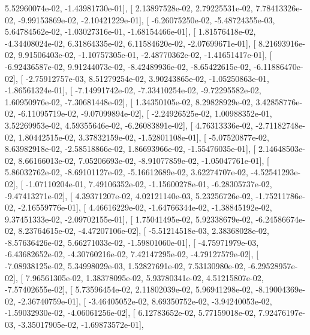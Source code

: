 \documentclass{article}
\begin{document}
          5.52960074e-02,  -1.43981730e-01],
       [  2.13897528e-02,   2.79225531e-02,   7.78413326e-02,
         -9.99153869e-02,  -2.10421229e-01],
       [ -6.26075250e-02,  -5.48724355e-03,   5.64784562e-02,
         -1.03027316e-01,  -1.68154466e-01],
       [  1.81576418e-02,  -4.34408024e-02,   6.31864335e-02,
          6.11584620e-02,  -2.07699671e-01],
       [  8.21693916e-02,   9.91506403e-02,  -1.10757305e-01,
         -2.48770362e-02,  -1.41651417e-01],
       [ -6.92436587e-02,   9.91244073e-02,  -8.42489936e-02,
         -8.65422615e-02,  -6.11886470e-02],
       [ -2.75912757e-03,   8.51279254e-02,   3.90243865e-02,
         -1.05250863e-01,  -1.86561324e-01],
       [ -7.14991742e-02,  -7.33410254e-02,  -9.72295582e-02,
          1.60950976e-02,  -7.30681448e-02],
       [  1.34350105e-02,   8.29828929e-02,   3.42858776e-02,
         -6.11095719e-02,  -9.07099894e-02],
       [ -2.24926525e-02,   1.00988352e-01,   3.52269953e-02,
          4.59355646e-02,  -6.26083891e-02],
       [  4.76313336e-02,  -2.71182748e-02,   1.80442515e-02,
          3.37832159e-02,  -1.52801108e-01],
       [ -5.07520877e-02,   8.63982918e-02,  -2.58518866e-02,
          1.86693966e-02,  -1.55476035e-01],
       [  2.14648503e-02,   8.66166013e-02,   7.05206693e-02,
         -8.91077859e-02,  -1.05047761e-01],
       [  5.86032762e-02,  -8.69101127e-02,  -5.16612689e-02,
          3.62274707e-02,  -4.52541293e-02],
       [ -1.07110204e-01,   7.49106352e-02,  -1.15600278e-01,
         -6.28305737e-02,  -9.47413271e-02],
       [  4.39371207e-02,   4.02121140e-03,   5.23256726e-02,
         -1.75211786e-02,  -2.16559776e-01],
       [  4.46616229e-02,  -1.64766344e-02,  -1.38845192e-02,
          9.37451333e-02,  -2.09702155e-01],
       [  1.75041495e-02,   5.92338679e-02,  -6.24586674e-02,
          8.23764615e-02,  -4.47207106e-02],
       [ -5.51214518e-03,   2.38368028e-02,  -8.57636426e-02,
          5.66271033e-02,  -1.59801060e-01],
       [ -4.75971979e-03,  -6.43682652e-02,  -4.30760216e-02,
          7.42147295e-02,  -4.79127579e-02],
       [ -7.08938125e-02,   5.34998029e-03,   1.52827691e-02,
          7.53130980e-02,  -6.29528957e-02],
       [  7.96561305e-02,   1.38378095e-02,   5.93780341e-02,
          4.51215807e-02,  -7.57402655e-02],
       [  5.73596454e-02,   2.11802039e-02,   5.96941298e-02,
         -8.19004369e-02,  -2.36740759e-01],
       [ -3.46405052e-02,   8.69350752e-02,  -3.94240053e-02,
         -1.59032930e-02,  -4.06061256e-02],
       [  6.12783652e-02,   5.77159018e-02,   7.92476197e-03,
         -3.35017905e-02,  -1.69873572e-01],
\end{document}
